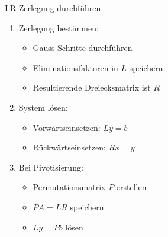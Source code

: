 \begin{KR}{LR-Zerlegung durchführen}
\begin{enumerate}
    \item Zerlegung bestimmen:
    \begin{itemize}
        \item Gauss-Schritte durchführen
        \item Eliminationsfaktoren in $L$ speichern
        \item Resultierende Dreiecksmatrix ist $R$
    \end{itemize}
    
    \item System lösen:
    \begin{itemize}
        \item Vorwärtseinsetzen: $Ly = b$
        \item Rückwärtseinsetzen: $Rx = y$
    \end{itemize}
    
    \item Bei Pivotisierung:
    \begin{itemize}
        \item Permutationsmatrix $P$ erstellen
        \item $PA = LR$ speichern
        \item $Ly = Pb$ lösen
    \end{itemize}
\end{enumerate}
\end{KR}

